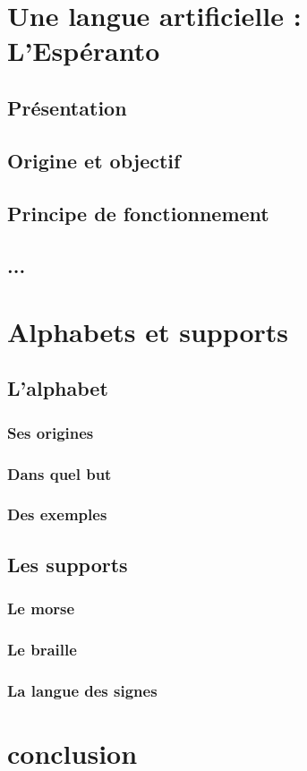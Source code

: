 \documentclass[french,a4paper]{article}
\begin{document}
\section{Une langue artificielle : L'Espéranto}
\subsection{Présentation}
\subsection{Origine et objectif}
\subsection{Principe de fonctionnement}
\subsection{...}

\section{Alphabets et supports}
\subsection{L'alphabet}
\subsubsection{Ses origines}
\subsubsection{Dans quel but}
\subsubsection{Des exemples}

\subsection{Les supports}
\subsubsection{Le morse}
\subsubsection{Le braille}
\subsubsection{La langue des signes}


\section{conclusion}
\end{document}
